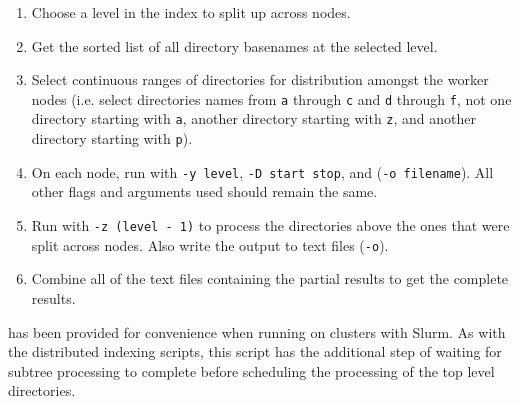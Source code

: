 \begin{enumerate}
\item Choose a level in the index to split up across nodes.
\item Get the sorted list of all directory basenames at the selected
  level.
\item Select continuous ranges of directories for distribution amongst
  the worker nodes (i.e. select directories names from \texttt{a}
  through \texttt{c} and \texttt{d} through \texttt{f}, not one
  directory starting with \texttt{a}, another directory starting with
  \texttt{z}, and another directory starting with \texttt{p}).
\item On each node, run \gufiquery with \texttt{-y level}, \texttt{-D
  start stop}, and (\texttt{-o filename}). All other flags and
  arguments used should remain the same.
\item Run \gufiquery with \texttt{-z (level - 1)} to process the
  directories above the ones that were split across nodes. Also
  write the output to text files (\texttt{-o}).
\item Combine all of the text files containing the partial results to
  get the complete results.
\end{enumerate}

\gufiquerydistributed has been provided for convenience when running
on clusters with Slurm. As with the distributed indexing scripts, this
script has the additional step of waiting for subtree processing to
complete before scheduling the processing of the top level
directories.

